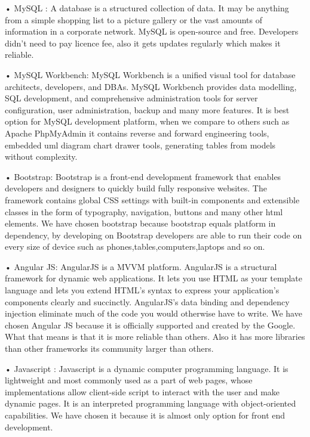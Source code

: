 • MySQL : A database is a structured collection of data. It may be anything from a simple shopping list to a picture gallery or the vast amounts of information in a corporate network.
\cite{mySQLTanim}
 MySQL is open-source and free. Developers didn't need to pay licence fee, also it gets updates regularly which makes it reliable.


• MySQL Workbench: MySQL Workbench is a unified visual tool for database architects, developers, and DBAs. MySQL Workbench provides data modelling, SQL development, and comprehensive administration tools for server configuration, user administration, backup and many more features. \cite{mySQLWorkTanim}
It is best option for MySQL development platform, when we compare to others such as Apache PhpMyAdmin it contains reverse and forward engineering tools, embedded uml diagram chart drawer tools, generating tables from models without complexity.


• Bootstrap: Bootstrap is a front-end development framework that enables developers and designers to quickly build fully responsive websites. The framework contains global CSS settings with built-in components and extensible classes in the form of typography, navigation, buttons and many other html elements.\cite{BootstrapTanim}
 We have chosen bootstrap because bootstrap equals platform in dependency, by developing on Bootstrap developers are able to run their code on every size of device such as phones,tables,computers,laptops and so on.


• Angular JS: AngularJS is a MVVM platform.  AngularJS is a structural framework for dynamic web applications. It lets you use HTML as your template language and lets you extend HTML’s syntax to express your application's components clearly and succinctly. AngularJS’s data binding and dependency injection eliminate much of the code you would otherwise have to write.\cite{AngularJSTanim}
 We have chosen Angular JS because it is officially supported and created by the Google. What that means is that it is more reliable than others. Also it has more libraries than other frameworks its community larger than others.

• Javascript : Javascript is a dynamic computer programming language. It is lightweight and most commonly used as a part of web pages, whose implementations allow client-side script to interact with the user and make dynamic pages. It is an interpreted programming language with object-oriented capabilities.\cite{JavascriptTanim}
 We have chosen it because it is almost only option for front end development. 

